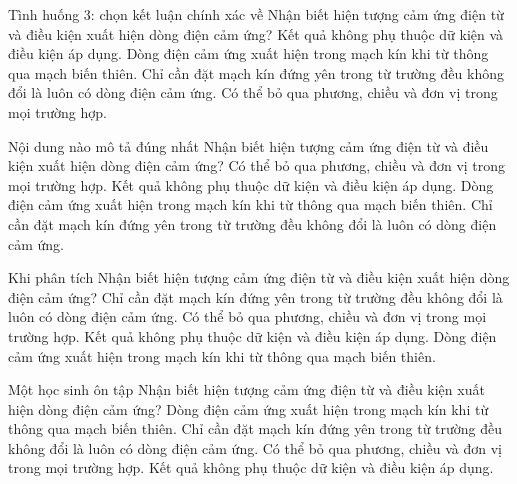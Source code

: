 \begin{ex}
Tình huống 3: chọn kết luận chính xác về Nhận biết hiện tượng cảm ứng điện từ và điều kiện xuất hiện dòng điện cảm ứng?
\choice
{Kết quả không phụ thuộc dữ kiện và điều kiện áp dụng.}
{\True Dòng điện cảm ứng xuất hiện trong mạch kín khi từ thông qua mạch biến thiên.}
{Chỉ cần đặt mạch kín đứng yên trong từ trường đều không đổi là luôn có dòng điện cảm ứng.}
{Có thể bỏ qua phương, chiều và đơn vị trong mọi trường hợp.}
\end{ex}

\begin{ex}
Nội dung nào mô tả đúng nhất Nhận biết hiện tượng cảm ứng điện từ và điều kiện xuất hiện dòng điện cảm ứng?
\choice
{Có thể bỏ qua phương, chiều và đơn vị trong mọi trường hợp.}
{Kết quả không phụ thuộc dữ kiện và điều kiện áp dụng.}
{\True Dòng điện cảm ứng xuất hiện trong mạch kín khi từ thông qua mạch biến thiên.}
{Chỉ cần đặt mạch kín đứng yên trong từ trường đều không đổi là luôn có dòng điện cảm ứng.}
\end{ex}

\begin{ex}
Khi phân tích Nhận biết hiện tượng cảm ứng điện từ và điều kiện xuất hiện dòng điện cảm ứng?
\choice
{Chỉ cần đặt mạch kín đứng yên trong từ trường đều không đổi là luôn có dòng điện cảm ứng.}
{Có thể bỏ qua phương, chiều và đơn vị trong mọi trường hợp.}
{Kết quả không phụ thuộc dữ kiện và điều kiện áp dụng.}
{\True Dòng điện cảm ứng xuất hiện trong mạch kín khi từ thông qua mạch biến thiên.}
\end{ex}

\begin{ex}
Một học sinh ôn tập Nhận biết hiện tượng cảm ứng điện từ và điều kiện xuất hiện dòng điện cảm ứng?
\choice
{\True Dòng điện cảm ứng xuất hiện trong mạch kín khi từ thông qua mạch biến thiên.}
{Chỉ cần đặt mạch kín đứng yên trong từ trường đều không đổi là luôn có dòng điện cảm ứng.}
{Có thể bỏ qua phương, chiều và đơn vị trong mọi trường hợp.}
{Kết quả không phụ thuộc dữ kiện và điều kiện áp dụng.}
\end{ex}

